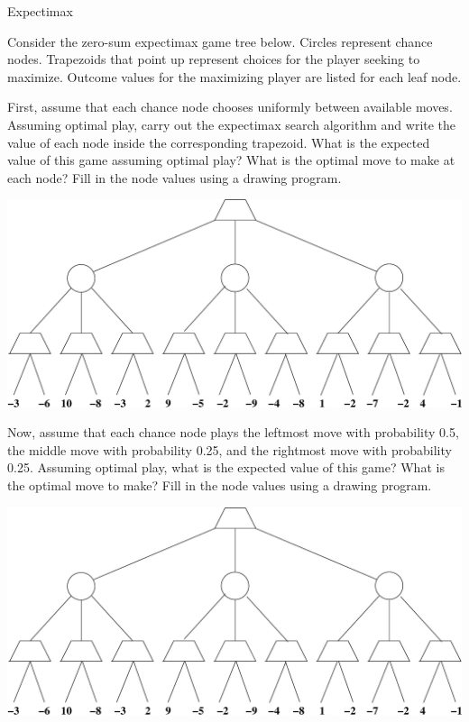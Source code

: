 \documentclass[twoside]{article}
\newcommand{\solutionspace}[4]{\fbox{\begin{minipage}[t][#1][t]{#2} \textbf{#3} 

\solution{}{#4} \end{minipage}}}
\begin{document}
\begin{problem} {Expectimax}

Consider the zero-sum expectimax game tree below.  Circles represent
chance nodes.  Trapezoids that point up represent choices for the
player seeking to maximize. Outcome values for the maximizing player
are listed for each leaf node.

\begin{question}[10] First, assume that each chance node chooses uniformly between
  available moves. Assuming optimal play, carry out the expectimax
  search algorithm and write the value of each node inside the
  corresponding trapezoid. What is the expected value of this game
  assuming optimal play? What is the optimal move to make at each
  node?  Fill in the node values using a drawing program.

\begin{center}
\includegraphics[width=6in]{expectimax.eps}
\end{center}

\solutionspace{1cm}{15cm}{}
{\Threea}


\end{question}


\begin{question}[10] Now, assume that each chance node plays the leftmost move with
  probability 0.5, the middle move with probability 0.25, and the
  rightmost move with probability 0.25. Assuming optimal play, what is
  the expected value of this game?  What is the optimal move to make?
  Fill in the node values using a drawing program.

\begin{center}
\includegraphics[width=6in]{expectimax.eps}
\end{center}

\solutionspace{1cm}{15cm}{}
{\Threeb}


\end{question}

\end{problem}
\end{document}
